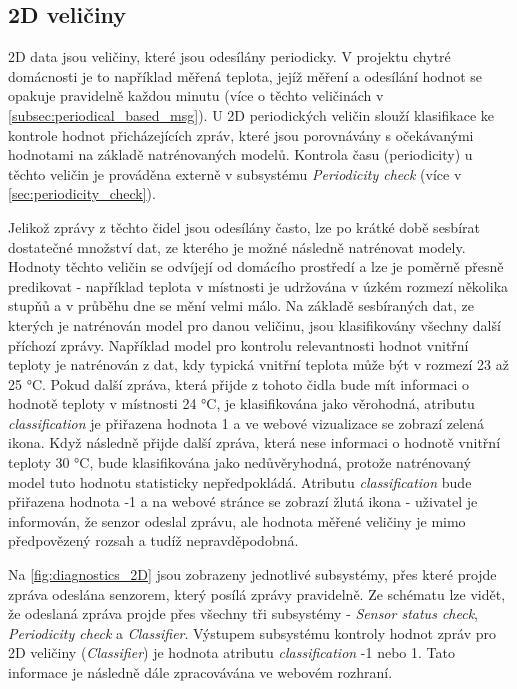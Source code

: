 \subsection{2D veličiny} \label{subsec:2D_quantities}
2D data jsou veličiny, které jsou odesílány periodicky. V projektu chytré domácnosti je to například měřená teplota, jejíž měření a odesílání hodnot se opakuje pravidelně každou minutu (více o těchto veličinách v \cref{subsec:periodical_based_msg}). U 2D periodických veličin slouží klasifikace ke kontrole hodnot přicházejících zpráv, které jsou porovnávány s očekávanými hodnotami na základě natrénovaných modelů. Kontrola času (periodicity) u těchto veličin je prováděna externě v subsystému \textit{Periodicity check} (více v \cref{sec:periodicity_check}). \par
Jelikož zprávy z těchto čidel jsou odesílány často, lze po krátké době sesbírat dostatečné množství dat, ze kterého je možné následně natrénovat modely. Hodnoty těchto veličin se odvíjejí od domácího prostředí a lze je poměrně přesně predikovat - například teplota v místnosti je udržována v úzkém rozmezí několika stupňů a v průběhu dne se mění velmi málo. Na základě sesbíraných dat, ze kterých je natrénován model pro danou veličinu, jsou klasifikovány všechny další příchozí zprávy. Například model pro kontrolu relevantnosti hodnot vnitřní teploty je natrénován z dat, kdy typická vnitřní teplota může být v rozmezí 23 až 25 \si{\degree}C. Pokud další zpráva, která přijde z tohoto čidla bude mít informaci o hodnotě teploty v místnosti 24 \si{\degree}C, je klasifikována jako věrohodná, atributu \textit{classification} je přiřazena hodnota 1 a ve webové vizualizace se zobrazí zelená ikona. Když následně přijde další zpráva, která nese informaci o hodnotě vnitřní teploty 30  \si{\degree}C, bude klasifikována jako nedůvěryhodná, protože natrénovaný model tuto hodnotu statisticky nepředpokládá. Atributu \textit{classification} bude přiřazena hodnota -1 a na webové stránce se zobrazí žlutá ikona - uživatel je informován, že senzor odeslal zprávu, ale hodnota měřené veličiny je mimo předpovězený rozsah a tudíž nepravděpodobná. \par
Na \cref{fig:diagnostics_2D} jsou zobrazeny jednotlivé subsystémy, přes které projde zpráva odeslána senzorem, který posílá zprávy pravidelně. Ze schématu lze vidět, že odeslaná zpráva projde přes všechny tři subsystémy - \textit{Sensor status check}, \textit{Periodicity check} a \textit{Classifier}. Výstupem subsystému kontroly hodnot zpráv pro 2D veličiny (\textit{Classifier}) je hodnota atributu \textit{classification} -1 nebo 1. Tato informace je následně dále zpracovávána ve webovém rozhraní. 


